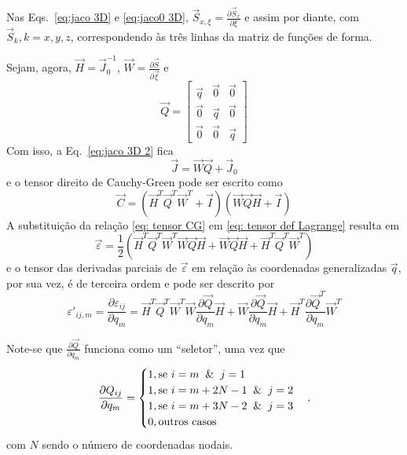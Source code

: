 Nas Eqs.~\eqref{eq:jaco 3D} e \eqref{eq:jaco0 3D}, $\vec{S}_{x,\xi} = \frac{\partial \vec{S}_x}{\partial \xi}$ e assim por
diante, com $\vec{S}_k, k=x,y,z$, correspondendo às três linhas da matriz de funções de forma.

Sejam, agora, $\vec{H}=\vec{J}_0^{-1}$, $\vec{W}=\frac{\partial \vec{S}}{\partial \vec{\xi}}$ e 
\begin{equation}
    \vec{Q} = \begin{bmatrix}
        \vec{q} & \vec{0}   & \vec{0}  \\
        \vec{0}   & \vec{q} & \vec{0}  \\
        \vec{0}   & \vec{0}   & \vec{q}
    \end{bmatrix}
\end{equation}
Com isso, a Eq.~\eqref{eq:jaco 3D 2} fica
\begin{equation} \vec{J} = \vec{W}\vec{Q} + \vec{J}_0 \label{eq:jaco 3D 3} \end{equation}
e o tensor direito de Cauchy-Green pode ser escrito como
\begin{equation}
    \vec{C} = \left(\vec{H}^T\vec{Q}^T\vec{W}^T + \vec{I}\right)\left(\vec{W}\vec{Q}\vec{H} + \vec{I}\right) \label{eq: tensor CG}
\end{equation}
A substituição da relação \eqref{eq: tensor CG} em \eqref{eq: tensor def Lagrange} resulta em
\begin{equation}
    \vec{\varepsilon} = \frac{1}{2} \left(\vec{H}^T\vec{Q}^T\vec{W}^T\vec{W}\vec{Q}\vec{H} + \vec{W}\vec{Q}\vec{H} +  \vec{H}^T\vec{Q}^T\vec{W}^T\right)
\end{equation}
e o tensor das derivadas parciais de $\vec{\varepsilon}$ em relação às coordenadas generalizadas $\vec{q}$, por sua vez, é de terceira ordem e pode ser descrito
por
\begin{equation}
    \varepsilon'_{ij,m} = \frac{\partial \varepsilon_{ij}}{\partial q_m} = \vec{H}^T \vec{Q}^T
            \vec{W}^T\vec{W}
            \frac{\partial \vec{Q}}{\partial q_m} \vec{H} + 
            \vec{W}
            \frac{\partial \vec{Q}}{\partial q_m} \vec{H}+
            \vec{H}^T
            \frac{\partial \vec{Q}^T}{\partial q_m} \vec{W}^T \label{eq: taxa cauchy}
\end{equation}

Note-se que $\frac{\partial \vec{Q}}{\partial q_m}$ funciona como um ``seletor'', uma vez que
\begin{equation}
    \frac{\partial Q_{ij}}{\partial q_m} = 
    \begin{cases}
        1, \text{se } i=m \And j=1 \\
        1, \text{se } i=m+2N-1 \And j=2 \\
        1, \text{se } i=m+3N-2 \And j=3 \\
        0, \text{outros casos}
    \end{cases}, \label{eq: dQdq}
\end{equation}
com $N$ sendo o número de coordenadas nodais.

